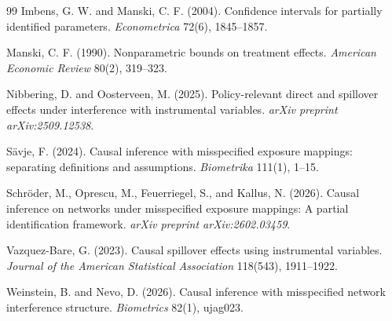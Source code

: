\documentclass[11pt]{article}
\theoremstyle{definition}
\theoremstyle{plain}
\theoremstyle{remark}
\begin{document}
\begin{thebibliography}{99}
Imbens, G. W. and Manski, C. F. (2004).
Confidence intervals for partially identified parameters.
\emph{Econometrica} 72(6), 1845--1857.

Manski, C. F. (1990).
Nonparametric bounds on treatment effects.
\emph{American Economic Review} 80(2), 319--323.

Nibbering, D. and Oosterveen, M. (2025).
Policy-relevant direct and spillover effects under interference with instrumental variables.
\emph{arXiv preprint arXiv:2509.12538}.

S\"{a}vje, F. (2024).
Causal inference with misspecified exposure mappings: separating definitions and assumptions.
\emph{Biometrika} 111(1), 1--15.

Schr\"{o}der, M., Oprescu, M., Feuerriegel, S., and Kallus, N. (2026).
Causal inference on networks under misspecified exposure mappings: A partial identification framework.
\emph{arXiv preprint arXiv:2602.03459}.

Vazquez-Bare, G. (2023).
Causal spillover effects using instrumental variables.
\emph{Journal of the American Statistical Association} 118(543), 1911--1922.

Weinstein, B. and Nevo, D. (2026).
Causal inference with misspecified network interference structure.
\emph{Biometrics} 82(1), ujag023.

\end{thebibliography}
\end{document}
